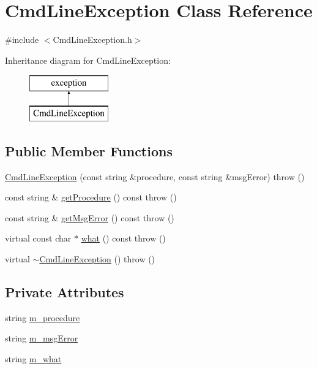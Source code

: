 \hypertarget{class_cmd_line_exception}{}\section{Cmd\+Line\+Exception Class Reference}
\label{class_cmd_line_exception}


{\ttfamily \#include $<$Cmd\+Line\+Exception.\+h$>$}

Inheritance diagram for Cmd\+Line\+Exception\+:\begin{figure}[H]
\begin{center}
\leavevmode
\includegraphics[height=2.000000cm]{db/d2d/class_cmd_line_exception}
\end{center}
\end{figure}
\subsection*{Public Member Functions}
\begin{DoxyCompactItemize}
\item 
\hyperlink{class_cmd_line_exception_ac383352e08309d309f1b815b5a62b472}{Cmd\+Line\+Exception} (const string \&procedure, const string \&msg\+Error)  throw ()
\item 
const string \& \hyperlink{class_cmd_line_exception_aefa18fa2e977e09f0853ab36c6d330fe}{get\+Procedure} () const   throw ()
\item 
const string \& \hyperlink{class_cmd_line_exception_ad719cad8bbc61d7bf6f9c9ceb2a5cb48}{get\+Msg\+Error} () const   throw ()
\item 
virtual const char $\ast$ \hyperlink{class_cmd_line_exception_a90c53c62d603a81935346595d80fa651}{what} () const   throw ()
\item 
virtual \hyperlink{class_cmd_line_exception_ab3ea0ef195fa069a70f9195190b76fbf}{$\sim$\+Cmd\+Line\+Exception} ()  throw ()
\end{DoxyCompactItemize}
\subsection*{Private Attributes}
\begin{DoxyCompactItemize}
\item 
string \hyperlink{class_cmd_line_exception_ab14ea8fbe4d82b550b7b2c9a9984852b}{m\+\_\+procedure}
\item 
string \hyperlink{class_cmd_line_exception_adaedcff54573ca22f9beb420f73e5fdf}{m\+\_\+msg\+Error}
\item 
string \hyperlink{class_cmd_line_exception_a7b2c261df1b39eeda27b8ecda39aedb9}{m\+\_\+what}
\end{DoxyCompactItemize}


